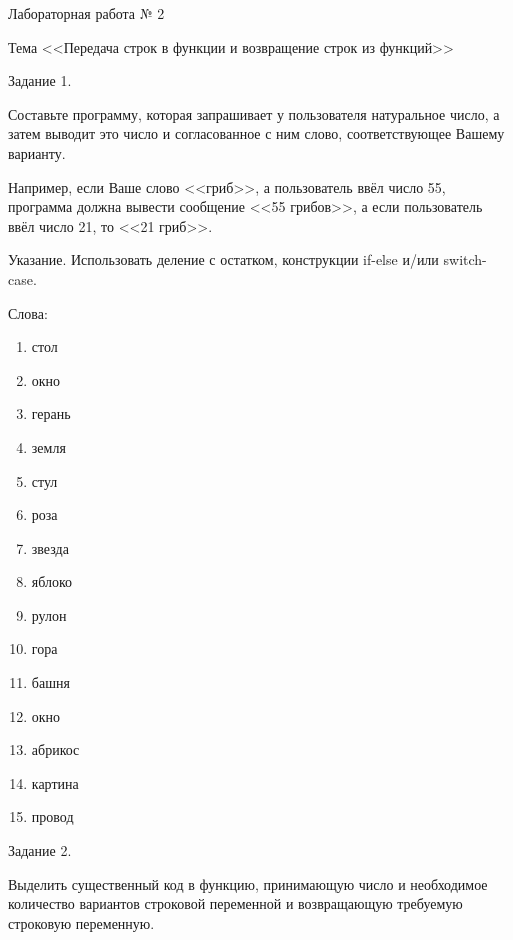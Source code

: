 Лабораторная работа № 2

Тема <<Передача строк в функции и возвращение строк из функций>>

Задание 1.

Составьте программу, которая запрашивает у пользователя натуральное число, а затем выводит это число и согласованное с ним слово, соответствующее Вашему варианту.

Например, если Ваше слово <<гриб>>, а пользователь ввёл число 55, программа должна вывести сообщение <<55 грибов>>, а если пользователь ввёл число 21, то <<21 гриб>>.

Указание. Использовать деление с остатком, конструкции if-else и/или switch-case.

Слова:

\begin{enumerate}

\item стол

\item окно

\item  герань

\item  земля

\item  стул

\item  роза 

\item  звезда

\item  яблоко

\item  рулон

\item  гора

\item  башня

\item  окно

\item  абрикос

\item  картина

\item  провод



\end{enumerate}


Задание 2.

Выделить существенный код в функцию, принимающую число и необходимое количество вариантов строковой переменной и возвращающую требуемую строковую переменную.

